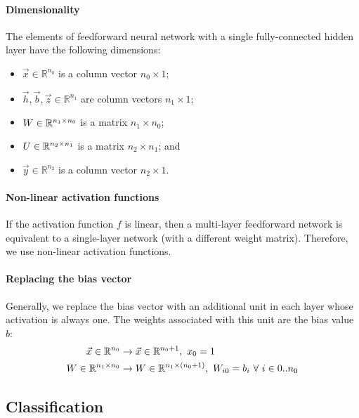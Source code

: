 \paragraph{Dimensionality}

The elements of feedforward neural network with a single fully-connected hidden
layer have the following dimensions:
\begin{itemize}
  \item $\vec{x} \in \mathbb{R}^{n_0}$ is a column vector $n_0 \times 1$;
  \item $\vec{h}, \vec{b}, \vec{z} \in \mathbb{R}^{n_1}$ are column vectors $n_1 \times 1$;
  \item $W \in \mathbb{R}^{n_1 \times n_0}$ is a matrix $n_1 \times n_0$;
  \item $U \in \mathbb{R}^{n_2 \times n_1}$ is a matrix $n_2 \times n_1$; and
  \item $\vec{y} \in \mathbb{R}^{n_2}$ is a column vector $n_2 \times 1$.
\end{itemize}

\paragraph{Non-linear activation functions}

If the activation function $f$ is linear, then a multi-layer feedforward network
is equivalent to a single-layer network (with a different weight matrix).
Therefore, we use non-linear activation functions.

\paragraph{Replacing the bias vector}

Generally, we replace the bias vector with an additional unit in each layer
whose activation is always one.
The weights associated with this unit are the bias value $b$:
\begin{align*}
  \vec{x} \in \mathbb{R}^{n_0}
   & \rightarrow \vec{x} \in \mathbb{R}^{n_0 + 1},\
  x_0 = 1                                                         \\
  W \in \mathbb{R}^{n_1 \times n_0}
   & \rightarrow W \in \mathbb{R}^{n_1 \times (n_0 + 1)},\
  W_{i0} = b_i \ \forall\ i \in 0 .. n_0                          \\
\end{align*}

\subsection{Classification}
\label{sec:7:nn-classification}

